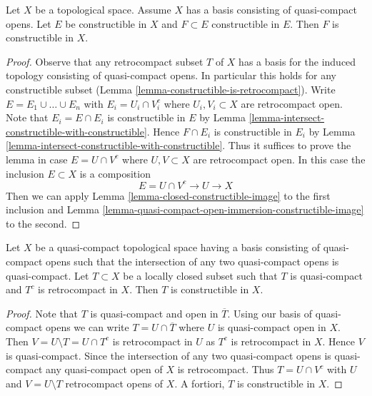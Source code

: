 \begin{lemma}
\label{lemma-constructible-in-constructible}
Let $X$ be a topological space. Assume
$X$ has a basis consisting of quasi-compact opens.
Let $E$ be constructible in $X$ and $F \subset E$ constructible in $E$.
Then $F$ is constructible in $X$.
\end{lemma}

\begin{proof}
Observe that any retrocompact subset $T$ of $X$ has a basis for the induced
topology consisting of quasi-compact opens. In particular this holds
for any constructible subset
(Lemma \ref{lemma-constructible-is-retrocompact}).
Write $E = E_1 \cup \ldots \cup E_n$ with $E_i = U_i \cap V_i^c$
where $U_i, V_i \subset X$ are retrocompact open.
Note that $E_i = E \cap E_i$ is constructible in $E$ by
Lemma \ref{lemma-intersect-constructible-with-constructible}.
Hence $F \cap E_i$ is constructible in $E_i$ by
Lemma \ref{lemma-intersect-constructible-with-constructible}.
Thus it suffices to prove the lemma in case $E = U \cap V^c$
where $U, V \subset X$ are retrocompact open.
In this case the inclusion $E \subset X$ is a composition
$$
E = U \cap V^c \to U \to X
$$
Then we can apply Lemma \ref{lemma-closed-constructible-image}
to the first inclusion and
Lemma \ref{lemma-quasi-compact-open-immersion-constructible-image}
to the second.
\end{proof}

\begin{lemma}
\label{lemma-locally-closed-constructible-image}
Let $X$ be a quasi-compact topological space having a basis consisting of
quasi-compact opens such that the intersection of any two
quasi-compact opens is quasi-compact.
Let $T \subset X$ be a locally closed subset
such that $T$ is quasi-compact and $T^c$ is retrocompact in $X$.
Then $T$ is constructible in $X$.
\end{lemma}

\begin{proof}
Note that $T$ is quasi-compact and open in $\overline{T}$.
Using our basis of quasi-compact opens we can write
$T = U \cap \overline{T}$ where $U$ is quasi-compact open in $X$.
Then $V = U \setminus T = U \cap T^c$ is retrocompact in $U$ as $T^c$
is retrocompact in $X$. Hence $V$ is quasi-compact. Since
the intersection of any two quasi-compact opens is quasi-compact
any quasi-compact open of $X$ is retrocompact. Thus $T = U \cap V^c$
with $U$ and $V = U \setminus T$ retrocompact opens of $X$.
A fortiori, $T$ is constructible in $X$.
\end{proof}


